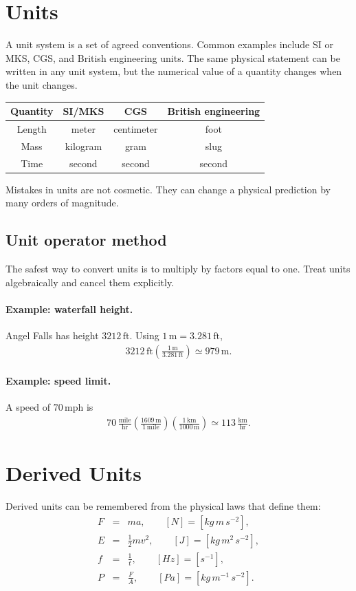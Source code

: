 \documentclass[12pt]{article}
\newcommand{\be}{\begin{eqnarray}}
\newcommand{\ee}{\end{eqnarray}}
\begin{document}
\section{Units}
A unit system is a set of agreed conventions. Common examples include SI or MKS, CGS, and British engineering units. The same physical statement can be written in any unit system, but the numerical value of a quantity changes when the unit changes.

\begin{center}
\begin{tabular}{c|c|c|c}
Quantity & SI/MKS & CGS & British engineering \\
\hline
Length & meter & centimeter & foot \\
Mass & kilogram & gram & slug \\
Time & second & second & second
\end{tabular}
\end{center}

Mistakes in units are not cosmetic. They can change a physical prediction by many orders of magnitude.

\subsection{Unit operator method}
The safest way to convert units is to multiply by factors equal to one. Treat units algebraically and cancel them explicitly.

\paragraph{Example: waterfall height.}
Angel Falls has height $3212\,\mathrm{ft}$. Using $1\,\mathrm{m}=3.281\,\mathrm{ft}$,
\be
3212\,\mathrm{ft}
\left(\frac{1\,\mathrm{m}}{3.281\,\mathrm{ft}}\right)
\simeq 979\,\mathrm{m}.
\ee

\paragraph{Example: speed limit.}
A speed of $70\,\mathrm{mph}$ is
\be
70\,\frac{\mathrm{mile}}{\mathrm{hr}}
\left(\frac{1609\,\mathrm{m}}{1\,\mathrm{mile}}\right)
\left(\frac{1\,\mathrm{km}}{1000\,\mathrm{m}}\right)
\simeq 113\,\frac{\mathrm{km}}{\mathrm{hr}}.
\ee

\section{Derived Units}
Derived units can be remembered from the physical laws that define them:
\be
F &=& ma, \qquad [N] = [kg\,m\,s^{-2}],\\
E &=& \frac{1}{2}mv^2, \qquad [J] = [kg\,m^2\,s^{-2}],\\
f &=& \frac{1}{t}, \qquad [Hz] = [s^{-1}],\\
P &=& \frac{F}{A}, \qquad [Pa] = [kg\,m^{-1}\,s^{-2}].
\ee
\end{document}
